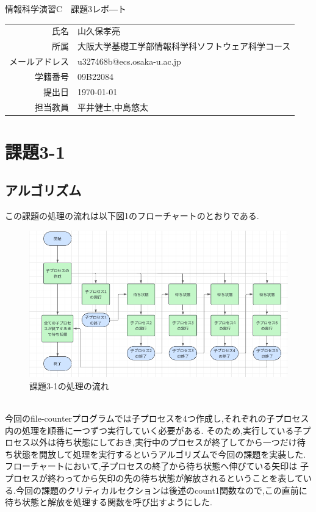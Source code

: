 \documentclass[dvipdfmx]{jarticle}
\begin{document}
\begin{titlepage}
    \begin{center}
        {\huge 情報科学演習C　課題3レポ―ト}
        \vspace{180pt}\\
        \begin{tabular}{rl}
            氏名 & 山久保孝亮\\
            所属 & 大阪大学基礎工学部情報科学科ソフトウェア科学コース\\
            メールアドレス & u327468b@ecs.osaka-u.ac.jp\\
            学籍番号 & 09B22084\\
            提出日 & \today\\
            担当教員 & 平井健士,中島悠太
        \end{tabular}
    \end{center}
\end{titlepage}
\section{課題3-1}
\subsection{アルゴリズム}
この課題の処理の流れは以下図1のフローチャートのとおりである.
\begin{figure}[h]
    \centering
    \includegraphics[width=12cm]{3-1hurotya.png}
    \caption{課題3-1の処理の流れ}
\end{figure}
\\
今回のfile-counterプログラムでは子プロセスを4つ作成し,それぞれの子プロセス内の処理を順番に一つずつ実行していく必要がある.
そのため,実行している子プロセス以外は待ち状態にしておき,実行中のプロセスが終了してから一つだけ待ち状態を開放して処理を実行するというアルゴリズムで今回の課題を実装した.フローチャートにおいて,子プロセスの終了から待ち状態へ伸びている矢印は
子プロセスが終わってから矢印の先の待ち状態が解放されるということを表している.今回の課題のクリティカルセクションは後述のcount1関数なので,この直前に待ち状態と解放を処理する関数を呼び出すようにした.
\end{document}
